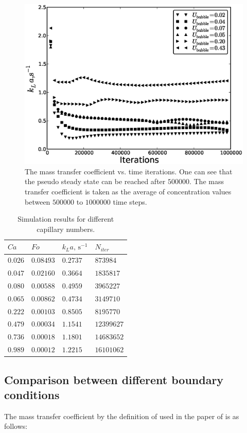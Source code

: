 \documentclass{article}
\begin{document}
\begin{figure}[htb!]
\includegraphics[width=\textwidth]{Figures/steady_state.eps}
\caption{The mass transfer coefficient vs. time iterations. One can see that the pseudo steady
state can be reached after $500000$. The mass transfer coefficient is taken as the average of
concentration values between $500000$ to $1000000$ time steps.\label{fig:steady:state}}
\end{figure}
\begin{table}[htb!]
\begin{tabularx}{\textwidth}{|X|X|X|X|}
\hline
$Ca$&$Fo$&$k_L a,\,\mathrm{s}^{-1}$&$N_{iter}$\\
\hline
$0.026$&$0.08493$&$0.2737$&$873984$\\
$0.047$&$0.02160$&$0.3664$&$1835817$\\
$0.080$&$0.00588$&$0.4959$&$3965227$\\
$0.065$&$0.00862$&$0.4734$&$3149710$\\
$0.222$&$0.00103$&$0.8505$&$8195770$\\
$0.479$&$0.00034$&$1.1541$&$12399627$\\
$0.736$&$0.00018$&$1.1801$&$14683652$\\
$0.989$&$0.00012$&$1.2215$&$16101062$\\
\hline
\end{tabularx}
\caption{Simulation results for different capillary numbers. \label{table:volumetric:coefficients}}
\end{table}

\subsection{Comparison between different boundary conditions}
The mass transfer coefficient by the definition of used in the paper of \citet{vanbaten} is as
follows:
\begin{equation}

\end{equation}
\end{document}
